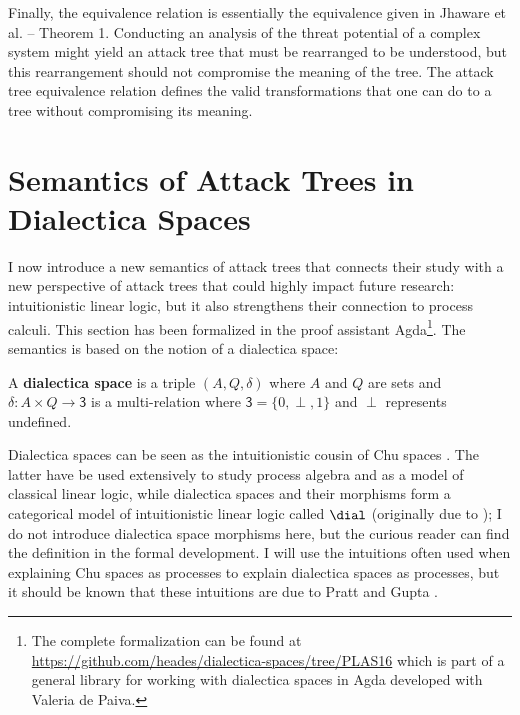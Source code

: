 Finally, the equivalence relation is essentially the equivalence given
in Jhaware et al. \cite{Jhawar:2015} -- Theorem 1.  Conducting an
analysis of the threat potential of a complex system might yield an
attack tree that must be rearranged to be understood, but this
rearrangement should not compromise the meaning of the tree.  The
attack tree equivalence relation defines the valid transformations
that one can do to a tree without compromising its meaning.

\section{Semantics of Attack Trees in Dialectica Spaces}
\label{sec:concrete_semantics_of_attack_trees_in_dialectica_spaces}

I now introduce a new semantics of attack trees that connects their
study with a new perspective of attack trees that could highly impact
future research: intuitionistic linear logic, but it also strengthens
their connection to process calculi.  This section has been formalized
in the proof assistant Agda\footnote{The complete formalization can be
  found at
  \url{https://github.com/heades/dialectica-spaces/tree/PLAS16}
  which is part of a general library for working with dialectica
  spaces in Agda developed with Valeria de Paiva.}.  The semantics is
based on the notion of a dialectica space:

\begin{definition}
  \label{def:dialectica-space}
  A \textbf{dialectica space} is a triple $(A, Q, \delta)$ where $A$
  and $Q$ are sets and $\delta : A \times Q \to \mathsf{3}$ is a
  multi-relation where $\mathsf{3} = \{0,\perp,1\}$ and $\perp$
  represents undefined.
\end{definition}

Dialectica spaces can be seen as the intuitionistic cousin
\cite{dePaiva:2006b} of Chu spaces \cite{Pratt:1999}.  The latter have
be used extensively to study process algebra and as a model of
classical linear logic, while dialectica spaces and their morphisms
form a categorical model of intuitionistic linear logic called $\dial$
(originally due to \cite{dePaiva:1987}); I do not introduce
dialectica space morphisms here, but the curious reader can find the
definition in the formal development. I will use the intuitions often
used when explaining Chu spaces as processes to explain dialectica
spaces as processes, but it should be known that these intuitions are
due to Pratt and Gupta \cite{Gupta:1994}.


